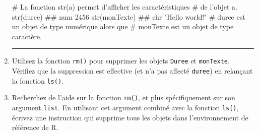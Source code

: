 \documentclass[12pt,twosided, notitlepage]{book}
\newenvironment{Shaded}{}{}
\newcommand{\KeywordTok}[1]{\textcolor[rgb]{0.00,0.00,1.00}{{#1}}}
\newcommand{\CommentTok}[1]{\textcolor[rgb]{0.00,0.50,0.00}{{#1}}}
\newcommand{\NormalTok}[1]{{#1}}
\newif \ifsol
\renewenvironment{Shaded}{\begin{snugshade}}{\end{snugshade}}
\begin{document}
\begin{enumerate}
\begin{Shaded}
\begin{Highlighting}[]
\CommentTok{# La fonction str(a) permet d'afficher les caractéristiques}
\CommentTok{# de l'objet a.}
\KeywordTok{str}\NormalTok{(duree)}
  \NormalTok{##  num 2456}
\KeywordTok{str}\NormalTok{(monTexte)}
  \NormalTok{##  chr "Hello world!"}
\CommentTok{# duree est un objet de type numérique alors que}
\CommentTok{# monTexte est un objet de type caractère.}
\end{Highlighting}
\end{Shaded}

  \begin{center} \rule{0.5\linewidth}{\linethickness}\end{center}

  \bigskip  \fi 
\item
  Utilisez la fonction \texttt{rm()} pour supprimer
  les objets \texttt{Duree} et \texttt{monTexte}. Vérifiez que la
  suppression est effective (et n'a pas affecté \texttt{duree}) en
  relançant la fonction \texttt{ls()}.

  \ifsol 

  \begin{center} \rule{0.5\linewidth}{\linethickness}\end{center}

\begin{Shaded}
\begin{Highlighting}[]
\CommentTok{# Objets présents au début de la question}
\KeywordTok{ls}\NormalTok{()}
  \NormalTok{## [1] "duree"    "Duree"    "min"      "monTexte" "sec"}

\CommentTok{# La fonction rm() (de l'anglais remove) permet de supprimer }
\CommentTok{# un ou plusieurs objets.}
\KeywordTok{rm}\NormalTok{(Duree, monTexte)}
\KeywordTok{ls}\NormalTok{()}
  \NormalTok{## [1] "duree" "min"   "sec"}
\CommentTok{# Les objets Duree et monTexte ont bien été supprimés.}
\end{Highlighting}
\end{Shaded}

  \begin{center} \rule{0.5\linewidth}{\linethickness}\end{center}

  \bigskip  \fi 
\item
  Recherchez de l'aide sur la fonction \texttt{rm()},
  et plus spécifiquement sur son argument \texttt{list}. En utilisant
  cet argument combiné avec la fonction
  \texttt{ls()}, écrivez une instruction qui supprime
  tous les objets dans l'environnement de référence de R.


\end{enumerate}
\end{document}
